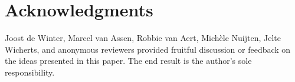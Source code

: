 \section*{Acknowledgments}
Joost de Winter, Marcel van Assen, Robbie van Aert, Michèle Nuijten, Jelte Wicherts, and anonymous reviewers provided fruitful discussion or feedback on the ideas presented in this paper. The end result is the author’s sole responsibility.
  
  